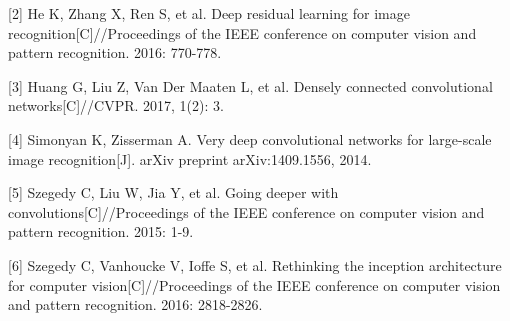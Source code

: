 \documentclass{article}
\begin{document}
[2] He K, Zhang X, Ren S, et al. Deep residual learning for image recognition[C]//Proceedings of the IEEE conference on computer vision and pattern recognition. 2016: 770-778.

[3] Huang G, Liu Z, Van Der Maaten L, et al. Densely connected convolutional networks[C]//CVPR. 2017, 1(2): 3.

[4] Simonyan K, Zisserman A. Very deep convolutional networks for large-scale image recognition[J]. arXiv preprint arXiv:1409.1556, 2014.

[5] Szegedy C, Liu W, Jia Y, et al. Going deeper with convolutions[C]//Proceedings of the IEEE conference on computer vision and pattern recognition. 2015: 1-9.

[6] Szegedy C, Vanhoucke V, Ioffe S, et al. Rethinking the inception architecture for computer vision[C]//Proceedings of the IEEE conference on computer vision and pattern recognition. 2016: 2818-2826.
\end{document}
